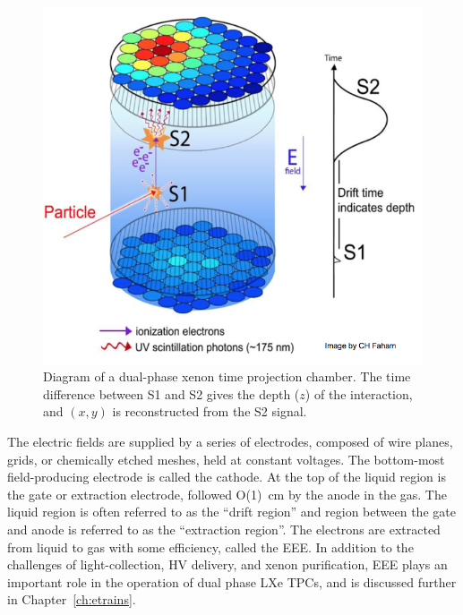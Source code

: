 \begin{figure}[htbp]
\begin{center}
\includegraphics[width=\textwidth]{figures/lxetpcs/TPC.png}
\caption{ Diagram of a dual-phase xenon time projection chamber. The time difference between S1 and S2 gives the depth ($z$) of the interaction, and $(x,y)$ is reconstructed from the S2 signal.}
\label{fig:tpc}
\end{center}
\end{figure}

The electric fields are supplied by a series of electrodes, composed of wire planes, grids, or chemically etched meshes, held at constant voltages. The bottom-most field-producing electrode is called the cathode. At the top of the liquid region is the gate or extraction electrode, followed O(1)~cm by the anode in the gas. The liquid region is often referred to as the ``drift region'' and region between the gate and anode is referred to as the ``extraction region''. The electrons are extracted from liquid to gas with some efficiency, called the \ac{EEE}. In addition to the challenges of light-collection, \ac{HV} delivery, and xenon purification, \ac{EEE} plays an important role in the operation of dual phase \ac{LXe} \ac{TPC}s, and is discussed further in Chapter~\ref{ch:etrains}.

